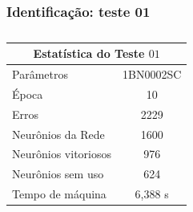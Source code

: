 \documentclass[aspectratio=10]{beamer} %
\begin{document}
\begin{frame}
	\frametitle{Identificação: teste 01}
	\begin{table}[H]
		\centering
		\caption{}
		\label{Estatistica do teste $01$}
		\begin{tabular}{@{}lc@{}}
			\toprule
			\multicolumn{2}{c}{Estatística do Teste $01$}         \\ \midrule
			Parâmetros                  & 1BN0002SC \\
			Época                       & 10       \\
			Erros                       & 2229       \\
			Neurônios da Rede           & 1600       \\
			Neurônios vitoriosos        & 976       \\
			Neurônios sem uso           & 624         \\
			Tempo de máquina            & 6,388 s   \\ \bottomrule
		\end{tabular}
	\end{table} 
\end{frame}
\end{document}
